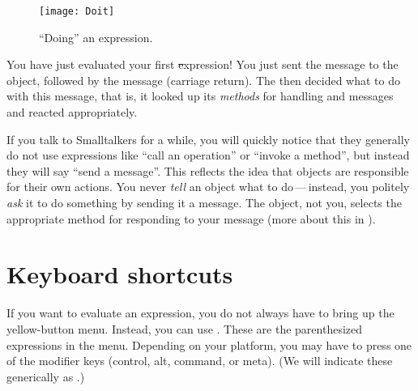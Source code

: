 \documentclass[a4paper,10pt,twoside]{book}
\begin{document}
\begin{figure}[htb]
\centerline {\texttt{[image: Doit]}}
\caption{``Doing'' an expression\label{fig:doit}.}
\end{figure}

You have just evaluated your first \st expression!
You just sent the message  to the  object, followed by the message  (carriage return).
The  then decided what to do with this message, that is, it looked up its \emph{methods} for handling  and  messages and reacted appropriately.

If you talk to Smalltalkers for a while, you will quickly notice that they generally do not use expressions like ``call an operation'' or ``invoke a method'', but instead they will say ``send a message''.
This reflects the idea that objects are responsible for their own actions.
You never \emph{tell} an object what to do\,---\,instead, you politely \emph{ask} it to do something by sending it a message.
The object, not you, selects the appropriate method for responding to your message (more about this in ).


\section{Keyboard shortcuts}

If you want to evaluate an expression, you do not always have to bring up the yellow-button menu.
Instead, you can use .
These are the parenthesized expressions in the menu.
Depending on your platform, you may have to press one of the modifier keys (control, alt, command, or meta).
(We will indicate these generically as .)
\end{document}

